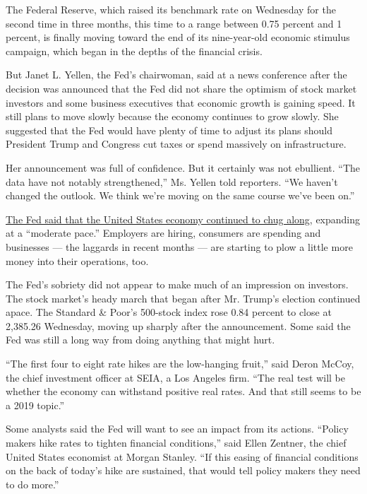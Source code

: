 The Federal Reserve, which raised its benchmark rate on Wednesday for
the second time in three months, this time to a range between 0.75
percent and 1 percent, is finally moving toward the end of its
nine-year-old economic stimulus campaign, which began in the depths of
the financial crisis.

But Janet L. Yellen, the Fed's chairwoman, said at a news conference
after the decision was announced that the Fed did not share the optimism
of stock market investors and some business executives that economic
growth is gaining speed. It still plans to move slowly because the
economy continues to grow slowly. She suggested that the Fed would have
plenty of time to adjust its plans should President Trump and Congress
cut taxes or spend massively on infrastructure.

Her announcement was full of confidence. But it certainly was not
ebullient. ``The data have not notably strengthened,'' Ms. Yellen told
reporters. ``We haven't changed the outlook. We think we're moving on
the same course we've been on.''

\href{https://www.federalreserve.gov/monetarypolicy/files/monetary20170315a1.pdf}{The
Fed said that the United States economy continued to chug along},
expanding at a ``moderate pace.'' Employers are hiring, consumers are
spending and businesses --- the laggards in recent months --- are
starting to plow a little more money into their operations, too.

The Fed's sobriety did not appear to make much of an impression on
investors. The stock market's heady march that began after Mr. Trump's
election continued apace. The Standard \& Poor's 500-stock index rose
0.84 percent to close at 2,385.26 Wednesday, moving up sharply after the
announcement. Some said the Fed was still a long way from doing anything
that might hurt.

``The first four to eight rate hikes are the low-hanging fruit,'' said
Deron McCoy, the chief investment officer at SEIA, a Los Angeles firm.
``The real test will be whether the economy can withstand positive real
rates. And that still seems to be a 2019 topic.''

Some analysts said the Fed will want to see an impact from its actions.
``Policy makers hike rates to tighten financial conditions,'' said Ellen
Zentner, the chief United States economist at Morgan Stanley. ``If this
easing of financial conditions on the back of today's hike are
sustained, that would tell policy makers they need to do more.''

